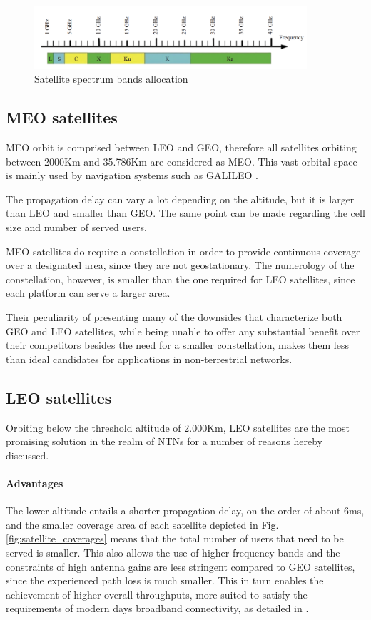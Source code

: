 \begin{figure}[ht]
    \centering
    \includegraphics[width=0.9\textwidth]{res/satellite-bands.png}
    \caption{Satellite spectrum bands allocation \cite{advances-comm-sat-sys}}
    \label{fig:satellite-bands}
\end{figure}

\subsection{MEO satellites}
\ac{MEO} orbit is comprised between \ac{LEO} and \ac{GEO}, therefore all satellites orbiting between 2000Km and 35.786Km are considered as \ac{MEO}. This vast orbital space is mainly used by navigation systems such as GALILEO \cite{types-of-orbits-esa}.

The propagation delay can vary a lot depending on the altitude, but it is larger than \ac{LEO} and smaller than \ac{GEO}. The same point can be made regarding the cell size and number of served users. 

\ac{MEO} satellites do require a constellation in order to provide continuous coverage over a designated area, since they are not geostationary. The numerology of the constellation, however, is smaller than the one required for \ac{LEO} satellites, since each platform can serve a larger area.

Their peculiarity of presenting many of the downsides that characterize both \ac{GEO} and \ac{LEO} satellites, while being unable to offer any substantial benefit over their competitors besides the need for a smaller constellation, makes them less than ideal candidates for applications in non-terrestrial networks.

\subsection{LEO satellites}
Orbiting below the threshold altitude of 2.000Km, \ac{LEO} satellites are the most promising solution in the realm of \ac{NTNs} for a number of reasons hereby discussed.

\paragraph{Advantages}
The lower altitude entails a shorter propagation delay, on the order of about 6ms, and the smaller coverage area of each satellite depicted in Fig. \ref{fig:satellite_coverages} means that the total number of users that need to be served is smaller. This also allows the use of higher frequency bands and the constraints of high antenna gains are less stringent compared to \ac{GEO} satellites, since the experienced path loss is much smaller. This in turn enables the achievement of higher overall throughputs, more suited to satisfy the requirements of modern days broadband connectivity, as detailed in \cite{satellite-communication-mmwave-giordani}.

